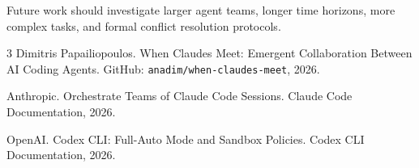 \documentclass[11pt,a4paper]{article}
\begin{document}
Future work should investigate larger agent teams, longer time horizons, more complex
tasks, and formal conflict resolution protocols.


\begin{thebibliography}{3}
Dimitris Papailiopoulos.
\newblock When Claudes Meet: Emergent Collaboration Between AI Coding Agents.
\newblock GitHub: \texttt{anadim/when-claudes-meet}, 2026.

Anthropic.
\newblock Orchestrate Teams of Claude Code Sessions.
\newblock Claude Code Documentation, 2026.

OpenAI.
\newblock Codex CLI: Full-Auto Mode and Sandbox Policies.
\newblock Codex CLI Documentation, 2026.
\end{thebibliography}
\end{document}

